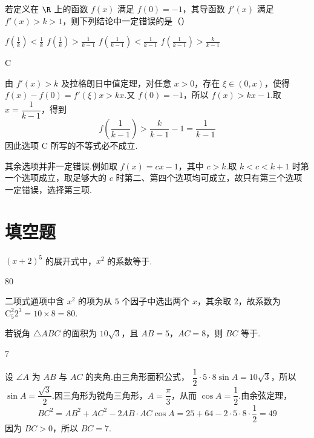 \begin{problem}
若定义在 \(\R\) 上的函数 \(f(x)\) 满足 \(f(0) = -1\)，其导函数 \(f'(x)\) 满足 \(f'(x) > k > 1\)，则下列结论中一定错误的是（\quad）

\choices
    {\(f\left(\frac{1}{k}\right) < \frac{1}{k}\)}
    {\(f\left(\frac{1}{k}\right) > \frac{1}{k - 1}\)}
    {\(f\left(\frac{1}{k - 1}\right) < \frac{1}{k - 1}\)}
    {\(f\left(\frac{1}{k - 1}\right) > \frac{k}{k - 1}\)}
\end{problem}

\begin{answer}
C
\end{answer}

\begin{solution}
由 \(f'(x)>k\) 及拉格朗日中值定理，对任意 \(x>0\)，存在 \(\xi\in(0,x)\)，使得
\(f(x)-f(0)=f'(\xi)x>kx\).又 \(f(0)=-1\)，所以
\(f(x)>kx-1\).取 \(x=\dfrac1{k-1}\)，得到
\[
f\left(\frac1{k-1}\right)>\frac{k}{k-1}-1=\frac1{k-1}
\]
因此选项 C 所写的不等式必不成立.

其余选项并非一定错误.例如取 \(f(x)=cx-1\)，其中 \(c>k\).取 \(k<c<k+1\) 时第一个选项成立，取足够大的 \(c\) 时第二、第四个选项均可成立，故只有第三个选项一定错误，选择第三项.
\end{solution}

\section{填空题}

\begin{problem}
\((x + 2)^{5}\) 的展开式中，\(x^{2}\) 的系数等于\fillinblank{}.
\end{problem}

\begin{answer}
80
\end{answer}

\begin{solution}
二项式通项中含 \(x^2\) 的项为从 \(5\) 个因子中选出两个 \(x\)，其余取 \(2\)，故系数为
\(\mathrm C_5^2 2^3=10\times8=80\).
\end{solution}

\begin{problem}
若锐角 \(\triangle ABC\) 的面积为 \(10\sqrt{3}\)，且 \(AB = 5\)，\(AC = 8\)，则 \(BC\) 等于\fillinblank{}.
\end{problem}

\begin{answer}
7
\end{answer}

\begin{solution}
设 \(\angle A\) 为 \(AB\) 与 \(AC\) 的夹角.由三角形面积公式，
\(\dfrac12\cdot5\cdot8\sin A=10\sqrt3\)，所以 \(\sin A=\dfrac{\sqrt3}{2}\).因三角形为锐角三角形，\(A=\dfrac\pi3\)，从而 \(\cos A=\dfrac12\).由余弦定理，
\[
BC^2=AB^2+AC^2-2AB\cdot AC\cos A
=25+64-2\cdot5\cdot8\cdot\frac12=49
\]
因为 \(BC>0\)，所以 \(BC=7\).
\end{solution}


